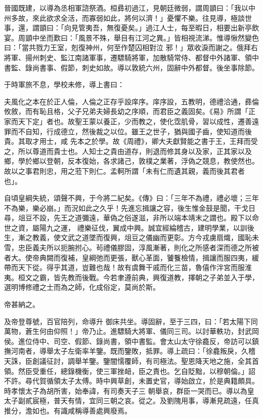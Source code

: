 \begin{pinyinscope}
 晉國既建，以導為丞相軍諮祭酒。桓彞初過江，見朝廷微弱，謂周顗曰：「我以中州多故，來此欲求全活，而寡弱如此，將何以濟！」憂懼不樂。往見導，極談世事，還，謂顗曰：「向見管夷吾，無復憂矣。」過江人士，每至暇日，相要出新亭飲宴。周顗中坐而歎曰：「風景不殊，舉目有江河之異。」皆相視流涕。惟導愀然變色曰：「當共戮力王室，剋復神州，何至作楚囚相對泣
 邪！」眾收淚而謝之。俄拜右將軍、揚州刺史、監江南諸軍事，遷驃騎將軍，加散騎常侍、都督中外諸軍、領中書監、錄尚書事、假節，刺史如故。導以敦統六州，固辭中外都督。後坐事除節。



 于時軍旅不息，學校未修，導上書曰：



 夫風化之本在於正人倫，人倫之正存乎設庠序。庠序設，五教明，德禮洽通，彞倫攸敘，而有恥且格，父子兄弟夫婦長幼之序順，而君臣之義固矣。《易》所謂「正家而天下定」者也。故聖王蒙以養正，少而教之，使化霑肌骨，習以成性，遷善遠罪而不自知，行成德立，然後裁之以位。雖王之世子，猶與國子齒，使知道而後貴。其取才用士，咸
 先本之於學。故《周禮》，卿大夫獻賢能之書于王，王拜而受之，所以尊道而貴士也。人知士之貴由道存，則退而修其身以及家，正其家以及鄉，學於鄉以登朝，反本復始，各求諸己，敦樸之業著，浮偽之競息，教使然也。故以之事君則忠，用之蒞下則仁。孟軻所謂「未有仁而遺其親，義而後其君者也」。



 自頃皇綱失統，頌聲不興，于今將二紀矣。《傳》曰：「三年不為禮，禮必壞；三年不為樂，樂必崩。」而況如此之久乎！先進忘揖讓之容，後生惟金鼓是聞，干戈日尋，俎豆不設，先王之道彌遠，華偽之俗遂滋，非所以端本靖末之謂也。殿下以命世之資，屬陽九之運，
 禮樂征伐，翼成中興。誠宜經綸稽古，建明學業，以訓後生，漸之教義，使文武之道墜而復興，俎豆之儀幽而更彰。方今戎虜扇熾，國恥未雪，忠臣義夫所以扼腕拊心。茍禮儀膠固，淳風漸著，則化之所感者深而德之所被者大。使帝典闕而復補，皇綱弛而更張，獸心革面，饕餮檢情，揖讓而服四夷，緩帶而天下從。得乎其道，豈難也哉！故有虞舞干戚而化三苗，魯僖作泮宮而服淮夷。桓文之霸，皆先教而後戰。今若聿遵前典，興復道教，擇朝之子弟並入于學，選明博修禮之士而為之師，化成俗定，莫尚於斯。



 帝甚納之。



 及帝登尊號，百官陪列，命導升
 御床共坐。導固辭，至于三四，曰：「若太陽下同萬物，蒼生何由仰照！」帝乃止。進驃騎大將軍、儀同三司。以討華軼功，封武岡侯。進位侍中、司空、假節、錄尚書，領中書監。會太山太守徐龕反，帝訪可以鎮撫河南者，導舉太子左衛率羊鑒。既而鑒敗，抵罪。導上疏曰：「徐龕叛戾，久稽天誅，臣創議征討，調舉羊鑒。鑒闇懦覆師，有司極法。聖恩降天地之施，全其首領。然臣受重任，總錄機衡，使三軍挫衄，臣之責也。乞自貶黜，以穆朝倫。」詔不許。尋代賀循領太子太傅。時中興草創，未置史官，導始啟立，於是典籍頗具。時孝懷太子為胡所害，始奉諱，有司奏天子三
 朝舉哀，群臣一哭而已。導以為皇太子副貳宸極，普天有情，宜同三朝之哀。從之。及劉隗用事，導漸見疏遠，任真推分，澹如也。有識咸稱導善處興廢焉。




\end{pinyinscope}
